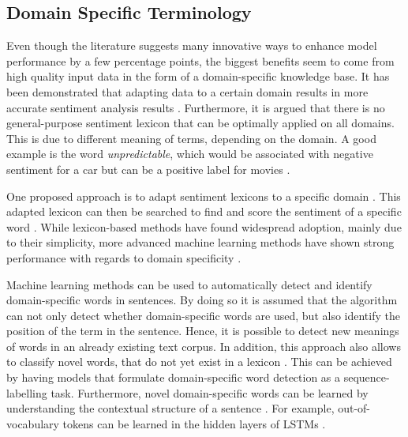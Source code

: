 \documentclass[11pt, a4paper]{article}
\begin{document}
\subsection{Domain Specific Terminology}
Even though the literature suggests many 
innovative ways to enhance model performance by a few percentage points, the biggest benefits seem to come from high quality 
input data in the form of a domain-specific knowledge base. It has been demonstrated that adapting data to a certain domain
results in more accurate sentiment analysis results \citep{park2015EfficientExtraction}.
Furthermore, it is argued that there is no general-purpose sentiment lexicon that can be optimally applied on all domains. 
This is due to different meaning of terms, depending on the domain. A good example is the word \emph{unpredictable}, 
which would be associated with negative sentiment for a car but can be a positive label for movies \citep{bo2008opinionmining}.

One proposed approach is to adapt sentiment lexicons to a specific domain \citep{Lu2011automaticconstruction}. This adapted lexicon can then be searched to find and score the sentiment 
of a specific word \citep{ashgar2014DetectionSlang}. 
While lexicon-based methods have found widespread adoption, mainly due to their simplicity, more advanced machine 
learning methods have shown strong performance with regards to domain specificity \citep{wang2020automaticconstructiondomainsentiment}. %

Machine learning methods can be used to automatically detect and identify domain-specific words in sentences. By doing so it is assumed that the 
algorithm can not only detect whether domain-specific words are used, but also identify 
the position of the term in the sentence. Hence, it is possible to detect new meanings 
of words in an already existing text corpus. In addition, this approach also allows to classify novel words, that do not yet 
exist in a lexicon \citep{pei2019slang}. This can be achieved by having models that formulate domain-specific word detection as a 
sequence-labelling task. Furthermore, novel domain-specific words can be learned by understanding the contextual 
structure of a sentence \citep{pei2019slang}. For example, out-of-vocabulary tokens can be learned in the hidden layers of 
LSTMs \citep{hochreiter1997lstm}.
\end{document}
